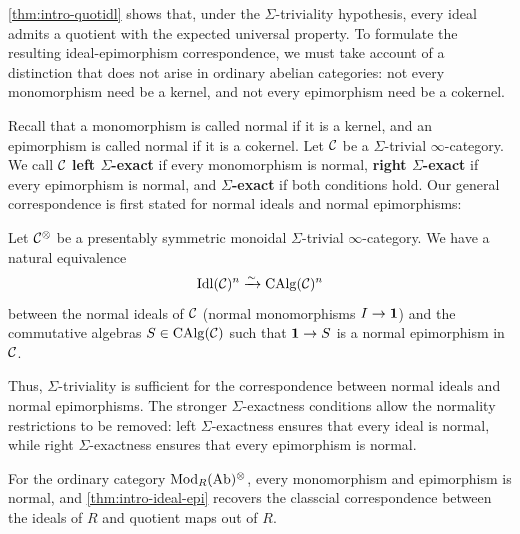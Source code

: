 \documentclass[10pt,a4paper,oneside]{article}
\begin{document}


\cref{thm:intro-quotidl} shows that, under the $\Sigma$-triviality hypothesis, every ideal admits a quotient with the expected universal property. To formulate the resulting ideal-epimorphism correspondence, we must take account of a distinction that does not arise in ordinary abelian categories: not every monomorphism need be a kernel, and not every epimorphism need be a cokernel.

Recall that a monomorphism is called normal if it is a kernel, and an epimorphism is called normal if it is a cokernel. Let $\mathcal{C}$ be a $\Sigma$-trivial $\infty$-category. We call $\mathcal{C}$ \textbf{left $\Sigma$-exact} if every monomorphism is normal, \textbf{right $\Sigma$-exact} if every epimorphism is normal, and \textbf{$\Sigma$-exact} if both conditions hold. Our general correspondence is first stated for normal ideals and normal epimorphisms:

\begin{thm}\label{thm:intro-ideal-epi}
Let $\mathcal{C}^\otimes$ be a presentably symmetric monoidal $\Sigma$-trivial $\infty$-category. We have a natural equivalence $$\operatorname{Idl}(\mathcal{C})^n\xrightarrow{\sim}\operatorname{CAlg}(\mathcal{C})^n$$
between the normal ideals of $\mathcal{C}$ (\ie normal monomorphisms $I \to \mathbf1$) and the commutative algebras $S\in\operatorname{CAlg}(\mathcal{C})$ such that $\mathbf1 \to S$ is a normal epimorphism in $\mathcal{C}$. %
\end{thm}

Thus, $\Sigma$-triviality is sufficient for the correspondence between normal ideals and normal epimorphisms. The stronger $\Sigma$-exactness conditions allow the normality restrictions to be removed: left $\Sigma$-exactness ensures that every ideal is normal, while right $\Sigma$-exactness ensures that every epimorphism is normal.

For the ordinary category $\operatorname{Mod}_{R}(\operatorname{Ab})^\otimes$, every monomorphism and epimorphism is normal, and \cref{thm:intro-ideal-epi} recovers the classcial correspondence between the ideals of $R$ and quotient maps out of $R$.
\end{document}

